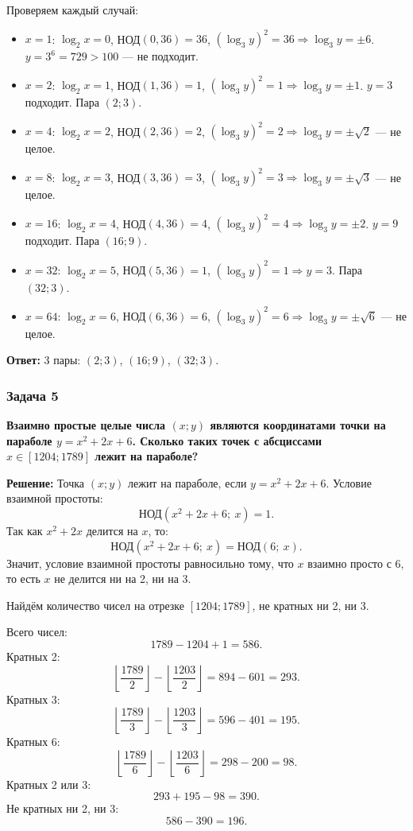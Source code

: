 \documentclass[12pt, a4paper]{article}
\begin{document}
Проверяем каждый случай:
\begin{itemize}
    \item $x=1$: $\log_2 x = 0$, НОД$(0,36)=36$, $(\log_3 y)^2 = 36 \Rightarrow \log_3 y = \pm 6$. $y = 3^6 = 729 > 100$ — не подходит.
    \item $x=2$: $\log_2 x = 1$, НОД$(1,36)=1$, $(\log_3 y)^2 = 1 \Rightarrow \log_3 y = \pm 1$. $y = 3$ подходит. Пара $(2;3)$.
    \item $x=4$: $\log_2 x = 2$, НОД$(2,36)=2$, $(\log_3 y)^2 = 2 \Rightarrow \log_3 y = \pm\sqrt{2}$ — не целое.
    \item $x=8$: $\log_2 x = 3$, НОД$(3,36)=3$, $(\log_3 y)^2 = 3 \Rightarrow \log_3 y = \pm\sqrt{3}$ — не целое.
    \item $x=16$: $\log_2 x = 4$, НОД$(4,36)=4$, $(\log_3 y)^2 = 4 \Rightarrow \log_3 y = \pm 2$. $y = 9$ подходит. Пара $(16;9)$.
    \item $x=32$: $\log_2 x = 5$, НОД$(5,36)=1$, $(\log_3 y)^2 = 1 \Rightarrow y = 3$. Пара $(32;3)$.
    \item $x=64$: $\log_2 x = 6$, НОД$(6,36)=6$, $(\log_3 y)^2 = 6 \Rightarrow \log_3 y = \pm\sqrt{6}$ — не целое.
\end{itemize}

\textbf{Ответ:} 3 пары: $(2;3)$, $(16;9)$, $(32;3)$.

\subsubsection*{Задача 5}
\textbf{Взаимно простые целые числа $(x;y)$ являются координатами точки на параболе $y = x^2 + 2x + 6$. Сколько таких точек с абсциссами $x \in [1204; 1789]$ лежит на параболе?}

\textbf{Решение:}
Точка $(x; y)$ лежит на параболе, если $y = x^2 + 2x + 6$. Условие взаимной простоты:
\[
\text{НОД}(x^2 + 2x + 6;\ x) = 1.
\]
Так как $x^2 + 2x$ делится на $x$, то:
\[
\text{НОД}(x^2 + 2x + 6;\ x) = \text{НОД}(6;\ x).
\]
Значит, условие взаимной простоты равносильно тому, что $x$ взаимно просто с 6, то есть $x$ не делится ни на 2, ни на 3.

Найдём количество чисел на отрезке $[1204; 1789]$, не кратных ни 2, ни 3.

Всего чисел:
\[
1789 - 1204 + 1 = 586.
\]
Кратных 2:
\[
\left\lfloor \frac{1789}{2} \right\rfloor - \left\lfloor \frac{1203}{2} \right\rfloor = 894 - 601 = 293.
\]
Кратных 3:
\[
\left\lfloor \frac{1789}{3} \right\rfloor - \left\lfloor \frac{1203}{3} \right\rfloor = 596 - 401 = 195.
\]
Кратных 6:
\[
\left\lfloor \frac{1789}{6} \right\rfloor - \left\lfloor \frac{1203}{6} \right\rfloor = 298 - 200 = 98.
\]
Кратных 2 или 3:
\[
293 + 195 - 98 = 390.
\]
Не кратных ни 2, ни 3:
\[
586 - 390 = 196.
\]
\end{document}
